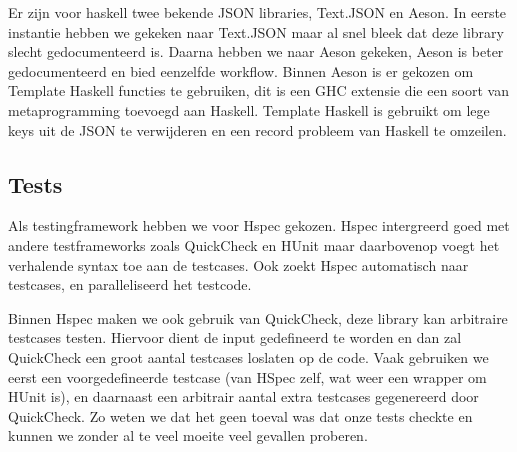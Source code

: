 Er zijn voor haskell twee bekende JSON libraries, Text.JSON en Aeson. In eerste instantie hebben we gekeken naar Text.JSON maar al snel bleek dat deze library slecht gedocumenteerd is. Daarna hebben we naar Aeson gekeken, Aeson is beter gedocumenteerd en bied eenzelfde workflow.
Binnen Aeson is er gekozen om Template Haskell functies te gebruiken, dit is een GHC extensie die een soort van metaprogramming toevoegd aan Haskell. Template Haskell is gebruikt om lege keys uit de JSON te verwijderen en een record probleem van Haskell te omzeilen.

\subsection{Tests}
Als testingframework hebben we voor Hspec gekozen. Hspec intergreerd goed met andere testframeworks zoals QuickCheck en HUnit maar daarbovenop voegt het verhalende syntax toe aan de testcases. Ook zoekt Hspec automatisch naar testcases, en paralleliseerd het testcode.

Binnen Hspec maken we ook gebruik van QuickCheck, deze library kan arbitraire testcases testen. Hiervoor dient de input gedefineerd te worden en dan zal QuickCheck een groot aantal testcases loslaten op de code. Vaak gebruiken we eerst een voorgedefineerde testcase (van HSpec zelf, wat weer een wrapper om HUnit is), en daarnaast een arbitrair aantal extra testcases gegenereerd door QuickCheck. Zo weten we dat het geen toeval was dat onze tests checkte en kunnen we zonder al te veel moeite veel gevallen proberen.
